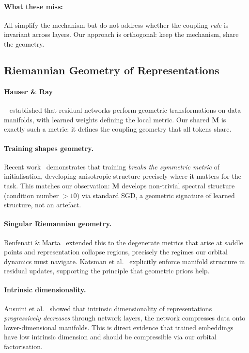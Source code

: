 \documentclass[11pt, a4paper]{article}
\newcommand{\M}{\mathbf{M}}
\theoremstyle{remark}
\begin{document}
\paragraph{What these miss:}
All simplify the mechanism but do not address whether the coupling \emph{rule} is invariant across layers.
Our approach is orthogonal: keep the mechanism, share the geometry.

\subsection{Riemannian Geometry of Representations}

\paragraph{Hauser \& Ray}~\cite{hauser2017riemannian} established that residual networks perform geometric transformations on data manifolds, with learned weights defining the local metric.
Our shared $\M$ is exactly such a metric: it defines the coupling geometry that all tokens share.

\paragraph{Training shapes geometry.}
Recent work~\cite{training2023geometry} demonstrates that training \emph{breaks the symmetric metric} of initialisation, developing anisotropic structure precisely where it matters for the task.
This matches our observation: $\M$ develops non-trivial spectral structure (condition number $> 10$) via standard SGD, a geometric signature of learned structure, not an artefact.

\paragraph{Singular Riemannian geometry.}
Benfenati \& Marta~\cite{benfenati2022singular} extended this to the degenerate metrics that arise at saddle points and representation collapse regions, precisely the regimes our orbital dynamics must navigate.
Katsman et al.~\cite{katsman2023riemannian} explicitly enforce manifold structure in residual updates, supporting the principle that geometric priors help.

\paragraph{Intrinsic dimensionality.}
Ansuini et al.~\cite{ansuini2019intrinsic} showed that intrinsic dimensionality of representations \emph{progressively decreases} through network layers, the network compresses data onto lower-dimensional manifolds.
This is direct evidence that trained embeddings have low intrinsic dimension and should be compressible via our orbital factorisation.
\end{document}
